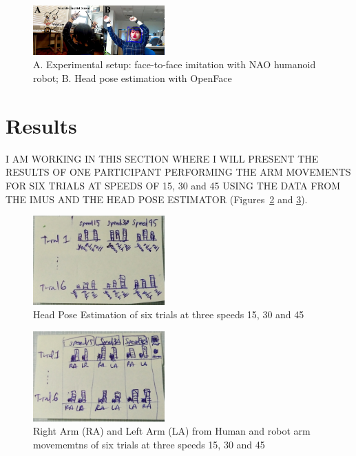 \documentclass{sigchi}
\begin{document}
\begin{figure}[!htb]
\centering
\includegraphics[width=0.45\textwidth]{figures/experiment/fig_w619h233}
\caption[PA]{A. Experimental setup: face-to-face imitation with NAO humanoid robot;
B. Head pose estimation with OpenFace \cite{Baltrusaitis2016}
}
\label{fig:exp}
\end{figure}


\section{Results}
I AM WORKING IN THIS SECTION WHERE I WILL PRESENT THE RESULTS OF
ONE PARTICIPANT PERFORMING THE ARM MOVEMENTS FOR SIX TRIALS
AT SPEEDS OF 15, 30 and 45 USING THE DATA FROM THE IMUS AND THE HEAD POSE
ESTIMATOR (Figures~\ref{fig:hpe} and \ref{fig:imus}).


\begin{figure}[!htb]
\centering
\includegraphics[width=0.45\textwidth]{figures/results/hpe}
\caption[PA]{Head Pose Estimation of six trials at three speeds 15, 30 and 45}
\label{fig:hpe}
\end{figure}



\begin{figure}[!htb]
\centering
\includegraphics[width=0.45\textwidth]{figures/results/imus}
\caption[PA]{Right Arm (RA) and Left Arm (LA) from Human and robot arm movememtns
of six trials at three speeds 15, 30 and 45}
\label{fig:imus}
\end{figure}
\end{document}
